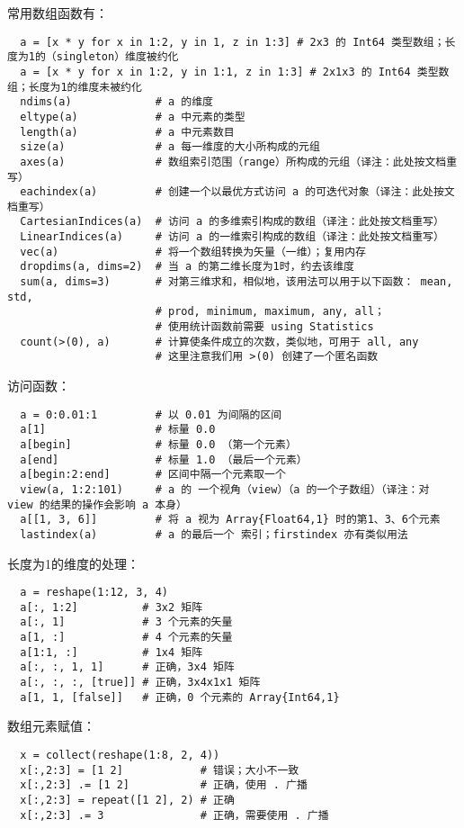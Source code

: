 \documentclass[10pt,a4paper]{article}
\begin{document}
常用数组函数有：
\begin{lstlisting}
  a = [x * y for x in 1:2, y in 1, z in 1:3] # 2x3 的 Int64 类型数组；长度为1的（singleton）维度被约化
  a = [x * y for x in 1:2, y in 1:1, z in 1:3] # 2x1x3 的 Int64 类型数组；长度为1的维度未被约化
  ndims(a)             # a 的维度
  eltype(a)            # a 中元素的类型
  length(a)            # a 中元素数目
  size(a)              # a 每一维度的大小所构成的元组
  axes(a)              # 数组索引范围（range）所构成的元组（译注：此处按文档重写）
  eachindex(a)         # 创建一个以最优方式访问 a 的可迭代对象（译注：此处按文档重写）
  CartesianIndices(a)  # 访问 a 的多维索引构成的数组（译注：此处按文档重写）
  LinearIndices(a)     # 访问 a 的一维索引构成的数组（译注：此处按文档重写）
  vec(a)               # 将一个数组转换为矢量（一维）；复用内存
  dropdims(a, dims=2)  # 当 a 的第二维长度为1时，约去该维度
  sum(a, dims=3)       # 对第三维求和，相似地，该用法可以用于以下函数： mean, std,
                       # prod, minimum, maximum, any, all；
                       # 使用统计函数前需要 using Statistics
  count(>(0), a)       # 计算使条件成立的次数，类似地，可用于 all, any
                       # 这里注意我们用 >(0) 创建了一个匿名函数
\end{lstlisting}

访问函数：
\begin{lstlisting}
  a = 0:0.01:1         # 以 0.01 为间隔的区间
  a[1]                 # 标量 0.0
  a[begin]             # 标量 0.0 （第一个元素）
  a[end]               # 标量 1.0 （最后一个元素）
  a[begin:2:end]       # 区间中隔一个元素取一个
  view(a, 1:2:101)     # a 的 一个视角（view）（a 的一个子数组）（译注：对 view 的结果的操作会影响 a 本身）
  a[[1, 3, 6]]         # 将 a 视为 Array{Float64,1} 时的第1、3、6个元素
  lastindex(a)         # a 的最后一个 索引；firstindex 亦有类似用法 
\end{lstlisting}

长度为1的维度的处理：
\begin{lstlisting}
  a = reshape(1:12, 3, 4)
  a[:, 1:2]          # 3x2 矩阵
  a[:, 1]            # 3 个元素的矢量
  a[1, :]            # 4 个元素的矢量
  a[1:1, :]          # 1x4 矩阵
  a[:, :, 1, 1]      # 正确，3x4 矩阵
  a[:, :, :, [true]] # 正确，3x4x1x1 矩阵
  a[1, 1, [false]]   # 正确，0 个元素的 Array{Int64,1}
\end{lstlisting}

数组元素赋值：
\begin{lstlisting}
  x = collect(reshape(1:8, 2, 4))
  x[:,2:3] = [1 2]            # 错误；大小不一致
  x[:,2:3] .= [1 2]           # 正确，使用 . 广播
  x[:,2:3] = repeat([1 2], 2) # 正确
  x[:,2:3] .= 3               # 正确，需要使用 . 广播
\end{lstlisting}
\end{document}
